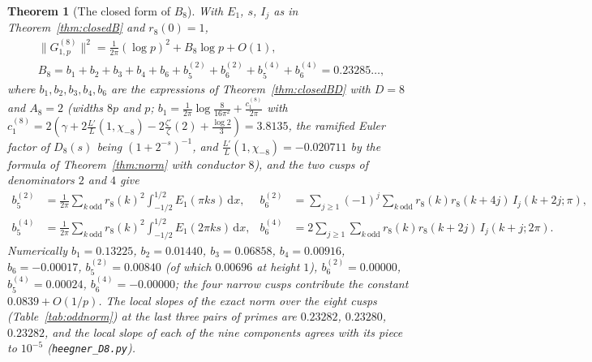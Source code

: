 \documentclass[11pt]{amsart}
\newtheorem{theorem}{Theorem}[section]
\theoremstyle{remark}
\newcommand{\dd}{\mathrm{d}}
\begin{document}
\begin{theorem}[The closed form of $B_8$]\label{thm:closedB8}
With $E_1$, $s$, $I_j$ as in Theorem~\ref{thm:closedB} and $r_8(0)=1$,
\begin{gather*}
\|G^{(8)}_{1,p}\|^2=\frac1{2\pi}(\log p)^2+B_8\log p+O(1),\\
B_8=b_1+b_2+b_3+b_4+b_6+b_5^{(2)}+b_6^{(2)}+b_5^{(4)}+b_6^{(4)}=0.23285\ldots,
\end{gather*}
where $b_1,b_2,b_3,b_4,b_6$ are the expressions of Theorem~\ref{thm:closedBD} with $D=8$ and $A_8=2$ (widths $8p$ and $p$; $b_1=\frac1{2\pi}\log\frac8{16\pi^2}+\frac{c_1^{(8)}}{2\pi}$ with $c_1^{(8)}=2(\gamma+2\frac{L'}L(1,\chi_{-8})-2\frac{\zeta'}\zeta(2)+\frac{\log2}3)=3.8135$, the ramified Euler factor of $D_8(s)$ being $(1+2^{-s})^{-1}$, and $\frac{L'}L(1,\chi_{-8})=-0.020711$ by the formula of Theorem~\ref{thm:norm} with conductor $8$), and the two cusps of denominators $2$ and $4$ give
\begin{align*}
b_5^{(2)}&=\frac1{2\pi}\sum_{k\ \mathrm{odd}}r_8(k)^2\int_{-1/2}^{1/2}E_1(\pi ks)\,\dd x,&
b_6^{(2)}&=\sum_{j\ge1}(-1)^j\sum_{k\ \mathrm{odd}}r_8(k)r_8(k+4j)\,I_j(k+2j;\pi),\\
b_5^{(4)}&=\frac1{2\pi}\sum_{k\ \mathrm{odd}}r_8(k)^2\int_{-1/2}^{1/2}E_1(2\pi ks)\,\dd x,&
b_6^{(4)}&=2\sum_{j\ge1}\sum_{k\ \mathrm{odd}}r_8(k)r_8(k+2j)\,I_j(k+j;2\pi).
\end{align*}
Numerically $b_1=0.13225$, $b_2=0.01440$, $b_3=0.06858$, $b_4=0.00916$, $b_6=-0.00017$, $b_5^{(2)}=0.00840$ (of which $0.00696$ at height $1$), $b_6^{(2)}=0.00000$, $b_5^{(4)}=0.00024$, $b_6^{(4)}=-0.00000$; the four narrow cusps contribute the constant $0.0839+O(1/p)$. The local slopes of the exact norm over the eight cusps (Table~\ref{tab:oddnorm}) at the last three pairs of primes are $0.23282$, $0.23280$, $0.23282$, and the local slope of each of the nine components agrees with its piece to $10^{-5}$ (\texttt{heegner\_D8.py}).
\end{theorem}
\end{document}

